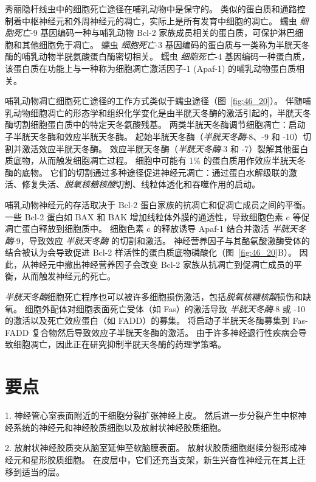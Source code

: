 秀丽隐杆线虫中的细胞死亡途径在哺乳动物中是保守的。
类似的蛋白质和通路控制着中枢神经元和外周神经元的凋亡，实际上是所有发育中细胞的凋亡。
蠕虫 \textit{细胞死亡}-9 基因编码一种与哺乳动物 Bcl-2 家族成员相关的蛋白质，可保护淋巴细胞和其他细胞免于凋亡。
蠕虫 \textit{细胞死亡}-3 基因编码的蛋白质与一类称为半胱天冬酶的哺乳动物半胱氨酸蛋白酶密切相关。
蠕虫 \textit{细胞死亡}-4 基因编码一种蛋白质，该蛋白质在功能上与一种称为细胞凋亡激活因子-1 (Apaf-1) 的哺乳动物蛋白质相关。


哺乳动物凋亡细胞死亡途径的工作方式类似于蠕虫途径（图~\ref{fig:46_20}）。
伴随哺乳动物细胞凋亡的形态学和组织化学变化是由半胱天冬酶的激活引起的，半胱天冬酶切割细胞蛋白质中的特定天冬氨酸残基。
两类半胱天冬酶调节细胞凋亡：启动子半胱天冬酶和效应半胱天冬酶。 起始半胱天冬酶（\textit{半胱天冬酶}-8、-9 和 -10）切割并激活效应半胱天冬酶。
效应半胱天冬酶（\textit{半胱天冬酶}-3 和 -7）裂解其他蛋白质底物，从而触发细胞凋亡过程。
细胞中可能有 1\% 的蛋白质用作效应半胱天冬酶的底物。
它们的切割通过多种途径促进神经元凋亡：通过蛋白水解级联的激活、修复失活、\textit{脱氧核糖核酸}切割、线粒体透化和吞噬作用的启动。


哺乳动物神经元的存活取决于 Bcl-2 蛋白家族的抗凋亡和促凋亡成员之间的平衡。
一些 Bcl-2 蛋白如 BAX 和 BAK 增加线粒体外膜的通透性，导致细胞色素 c 等促凋亡蛋白释放到细胞质中。
细胞色素 c 的释放诱导 Apaf-1 结合并激活 \textit{半胱天冬酶}-9，导致效应 \textit{半胱天冬酶} 的切割和激活。
神经营养因子与其酪氨酸激酶受体的结合被认为会导致促进 Bcl-2 样活性的蛋白质底物磷酸化（图~\ref{fig:46_20}B）。
因此，从神经元中撤出神经营养因子会改变 Bcl-2 家族从抗凋亡到促凋亡成员的平衡，从而触发神经元的死亡。


\textit{半胱天冬酶}细胞死亡程序也可以被许多细胞损伤激活，包括\textit{脱氧核糖核酸}损伤和缺氧。
细胞外配体对细胞表面死亡受体（如 Fas）的激活导致 \textit{半胱天冬酶}-8 或 -10 的激活以及死亡效应蛋白（如 FADD）的募集。
将启动子半胱天冬酶募集到 Fas-FADD 复合物然后导致效应子半胱天冬酶的激活。
由于许多神经退行性疾病会导致细胞凋亡，因此正在研究抑制半胱天冬酶的药理学策略。



\section{要点}

1. 神经管心室表面附近的干细胞分裂扩张神经上皮。
然后进一步分裂产生中枢神经系统的神经元和神经胶质细胞以及放射状神经胶质细胞。


2. 放射状神经胶质突从脑室延伸至软脑膜表面。
放射状胶质细胞继续分裂形成神经元和星形胶质细胞。
在皮层中，它们还充当支架，新生兴奋性神经元在其上迁移到适当的层。


